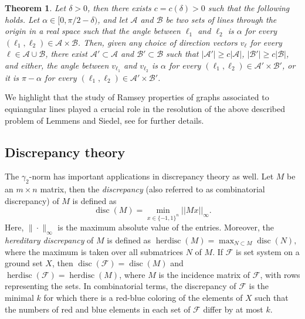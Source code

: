 \documentclass[11pt]{amsart}
\theoremstyle{plain}
\newtheorem{theorem}{Theorem}[section]
\theoremstyle{definition}
\DeclareMathOperator{\disc}{disc}
\DeclareMathOperator{\herdisc}{herdisc}
\newcommand{\cF}{\mathcal{F}}
\begin{document}
\begin{theorem}
    Let $\delta>0$, then there exists $c=c(\delta)>0$ such that the following holds. Let $\alpha\in [0,\pi/2-\delta)$, and let $\mathcal{A}$ and $\mathcal{B}$ be two sets of lines through the origin in a real space such that the angle between $\ell_1$ and $\ell_2$ is $\alpha$ for every $(\ell_1,\ell_2)\in \mathcal{A}\times \mathcal{B}$. Then, given any choice of direction vectors $v_{\ell}$ for every $\ell\in\mathcal{A}\cup \mathcal{B}$, there exist $\mathcal{A}'\subset \mathcal{A}$ and $\mathcal{B}'\subset\mathcal{B}$ such that $|\mathcal{A}'|\geq c|\mathcal{A}|$, $|\mathcal{B}'|\geq c|\mathcal{B}|$, and either,  the angle between $v_{\ell_1}$ and $v_{\ell_2}$ is $\alpha$ for every $(\ell_1,\ell_2)\in\mathcal{A}'\times \mathcal{B}'$, or it is $\pi-\alpha$ for every $(\ell_1,\ell_2)\in\mathcal{A}'\times \mathcal{B}'$.
\end{theorem}

 We highlight that the study of  Ramsey properties of graphs associated to equiangular lines played a crucial role in the resolution of the above described problem of Lemmens and Siedel, see \cite{BDKS,JTYZZ} for further details.

\subsection{Discrepancy theory}
The $\gamma_2$-norm has important applications in discrepancy theory as well. Let $M$ be an $m\times n$ matrix, then the \emph{discrepancy} (also referred to as combinatorial discrepancy) of $M$ is defined as
$$\disc(M)=\min_{x\in \{-1,1\}^n} ||Mx||_{\infty}.$$
Here, $\|\cdot\|_{\infty}$ is the maximum absolute value of the entries. Moreover, the \emph{hereditary discrepancy} of $M$ is defined as $\herdisc(M)=\max_{N\subset M}  \disc(N),$ where the maximum is taken over all submatrices $N$ of $M$.  If $\cF$ is set system on a ground set $X$, then $\disc(\cF)=\disc(M)$ and $\herdisc(\cF)=\herdisc(M)$, where $M$ is the incidence matrix of $\cF$, with rows representing the sets. In combinatorial terms, the discrepancy of $\cF$ is the minimal $k$ for which there is a red-blue coloring of the elements of $X$ such that the numbers of red and blue elements in each set of $\cF$ differ by at most $k$.
\end{document}
